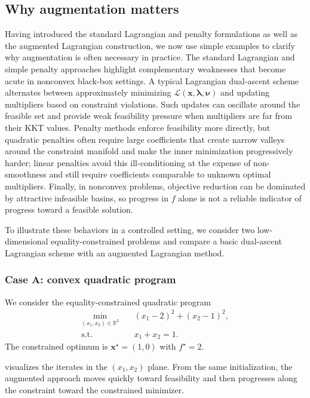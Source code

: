 \documentclass[11pt,a4paper]{article}
\numberwithin{equation}{section}
\numberwithin{figure}{section}
\numberwithin{table}{section}
\theoremstyle{definition}
\newcommand{\R}{\mathbb{R}}
\begin{document}
\subsection{Why augmentation matters}\label{subsec:al-limitations}
Having introduced the standard Lagrangian and penalty formulations as well as the augmented Lagrangian construction, we now use simple examples to clarify why augmentation is often necessary in practice. The standard Lagrangian and simple penalty approaches highlight complementary weaknesses that become acute in nonconvex black-box settings. A typical Lagrangian dual-ascent scheme alternates between approximately minimizing $\mathcal{L}(\bm{x},\bm{\lambda},\bm{\nu})$ and updating multipliers based on constraint violations. Such updates can oscillate around the feasible set and provide weak feasibility pressure when multipliers are far from their KKT values. Penalty methods enforce feasibility more directly, but quadratic penalties often require large coefficients that create narrow valleys around the constraint manifold and make the inner minimization progressively harder; linear penalties avoid this ill-conditioning at the expense of non-smoothness and still require coefficients comparable to unknown optimal multipliers.\cite{NocedalWright,DufosseHansen} Finally, in nonconvex problems, objective reduction can be dominated by attractive infeasible basins, so progress in $f$ alone is not a reliable indicator of progress toward a feasible solution.

To illustrate these behaviors in a controlled setting, we consider two low-dimensional equality-constrained problems and compare a basic dual-ascent Lagrangian scheme with an augmented Lagrangian method.

\subsubsection{Case A: convex quadratic program}\label{subsubsec:case-a}
We consider the equality-constrained quadratic program
\begin{equation}
  \label{eq:case-a}
  \begin{aligned}
    \min_{(x_1,x_2)\in\R^2}\quad & (x_1-2)^2 + (x_2-1)^2,\\
    \text{s.t.}\quad & x_1 + x_2 = 1.
  \end{aligned}
\end{equation}
The constrained optimum is $\bm{x}^\star=(1,0)$ with $f^\star=2$.

 visualizes the iterates in the $(x_1,x_2)$ plane. From the same initialization, the augmented approach moves quickly toward feasibility and then progresses along the constraint toward the constrained minimizer.
\end{document}
